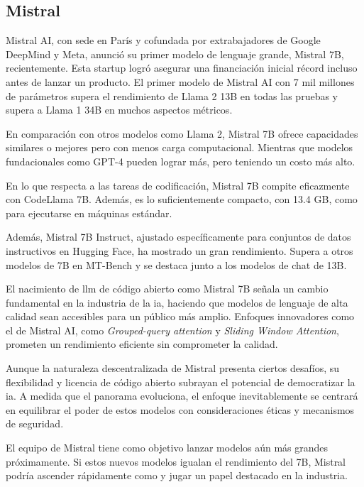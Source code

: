 \subsection{Mistral}

Mistral AI, con sede en París y cofundada por extrabajadores de Google DeepMind y Meta, anunció su primer modelo de lenguaje grande, Mistral 7B, recientemente. Esta startup logró asegurar una financiación inicial récord incluso antes de lanzar un producto. El primer modelo de Mistral AI con 7 mil millones de parámetros supera el rendimiento de Llama 2 13B en todas las pruebas y supera a Llama 1 34B en muchos aspectos métricos\cite{Zhong2023AGIEvalAH}.


En comparación con otros modelos como Llama 2, Mistral 7B ofrece capacidades similares o mejores pero con menos carga computacional. Mientras que modelos fundacionales como GPT-4 pueden lograr más, pero teniendo un costo más alto.

En lo que respecta a las tareas de codificación, Mistral 7B compite eficazmente con CodeLlama 7B. Además, es lo suficientemente compacto, con 13.4 GB, como para ejecutarse en máquinas estándar.

Además, Mistral 7B Instruct, ajustado específicamente para conjuntos de datos instructivos en Hugging Face, ha mostrado un gran rendimiento. Supera a otros modelos de 7B en MT-Bench y se destaca junto a los modelos de chat de 13B.

El nacimiento de \acrlong{llm} de código abierto como Mistral 7B señala un cambio fundamental en la industria de la \acrlong{ia}, haciendo que modelos de lenguaje de alta calidad sean accesibles para un público más amplio. Enfoques innovadores como el de Mistral AI, como \textit{Grouped-query attention} y \textit{Sliding Window Attention}, prometen un rendimiento eficiente sin comprometer la calidad\cite{MiitaMistral}.

Aunque la naturaleza descentralizada de Mistral presenta ciertos desafíos, su flexibilidad y licencia de código abierto subrayan el potencial de democratizar la \acrlong{ia}. A medida que el panorama evoluciona, el enfoque inevitablemente se centrará en equilibrar el poder de estos modelos con consideraciones éticas y mecanismos de seguridad.

El equipo de Mistral tiene como objetivo lanzar modelos aún más grandes próximamente. Si estos nuevos modelos igualan el rendimiento del 7B, Mistral podría ascender rápidamente como y jugar un papel destacado en la industria.

